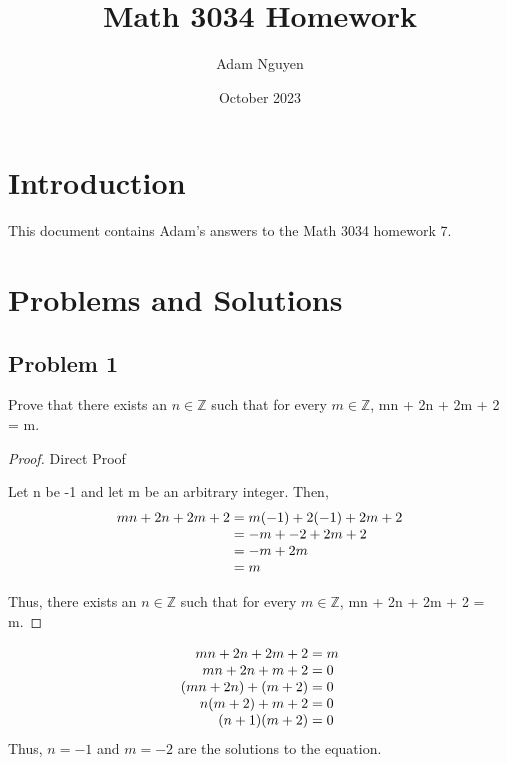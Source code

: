 \documentclass{article}
\title{Math 3034 Homework}
\author{Adam Nguyen}
\date{October 2023}
\begin{document}
\maketitle

\section{Introduction}
This document contains Adam's answers to the Math 3034 homework 7.

\section{Problems and Solutions}

\subsection*{Problem 1}
Prove that there exists an \( n \in \mathbb{Z} \) such that for every \( m \in \mathbb{Z} \),
 mn + 2n + 2m + 2 = m. 

\begin{proof} 

Direct Proof

\vspace{1em}
Let n be -1 and let m be an arbitrary integer. 
Then,
\begin{equation*}
\begin{gathered}
\begin{array}{r@{{}={}}l}
mn + 2n + 2m + 2 & m(-1) + 2(-1) + 2m + 2 \\
 & -m + -2 + 2m + 2 \\
 & -m + 2m \\
& m \\
\end{array}
\end{gathered}
\end{equation*}

Thus, there exists an \( n \in \mathbb{Z} \) such that for every \( m \in \mathbb{Z} \), mn + 2n + 2m + 2 = m. 

\end{proof}
\vspace{1cm}  %

\begin{sidework}

\begin{equation*}
\begin{gathered}
\begin{array}{r@{{}={}}l}
mn + 2n + 2m + 2 & m \\
mn + 2n + m + 2 & 0 \\
(mn + 2n) + (m + 2) & 0 \\
n(m + 2) + m + 2 & 0 \\
(n + 1)(m + 2) & 0 \\
\end{array}
\end{gathered}
\end{equation*}
Thus, \( n = -1 \) and \( m = -2 \) are the solutions to the equation.

\end{sidework}
\end{document}
